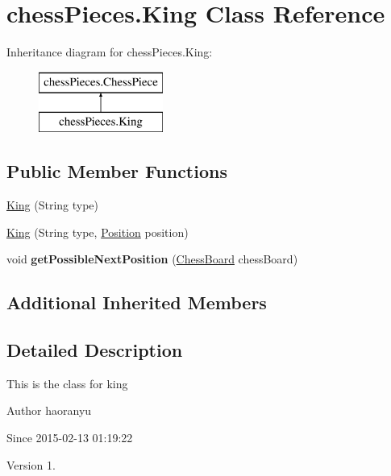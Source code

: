 \hypertarget{classchess_pieces_1_1_king}{\section{chess\+Pieces.\+King Class Reference}
\label{classchess_pieces_1_1_king}
}
Inheritance diagram for chess\+Pieces.\+King\+:\begin{figure}[H]
\begin{center}
\leavevmode
\includegraphics[height=2.000000cm]{classchess_pieces_1_1_king}
\end{center}
\end{figure}
\subsection*{Public Member Functions}
\begin{DoxyCompactItemize}
\item 
\hyperlink{classchess_pieces_1_1_king_a66cabcc1ead5022216f5ed170a4c4bd6}{King} (String type)
\item 
\hyperlink{classchess_pieces_1_1_king_a7a84e3a42cf0ea6b242383381ceee51b}{King} (String type, \hyperlink{classmodels_1_1_position}{Position} position)
\item 
\hypertarget{classchess_pieces_1_1_king_a8dad37f9c467f85dbcbe893726f67078}{void {\bfseries get\+Possible\+Next\+Position} (\hyperlink{classmodels_1_1_chess_board}{Chess\+Board} chess\+Board)}\label{classchess_pieces_1_1_king_a8dad37f9c467f85dbcbe893726f67078}

\end{DoxyCompactItemize}
\subsection*{Additional Inherited Members}


\subsection{Detailed Description}
This is the class for king \begin{DoxyAuthor}{Author}
haoranyu 
\end{DoxyAuthor}
\begin{DoxySince}{Since}
2015-\/02-\/13 01\+:19\+:22 
\end{DoxySince}
\begin{DoxyVersion}{Version}
1. 
\end{DoxyVersion}


